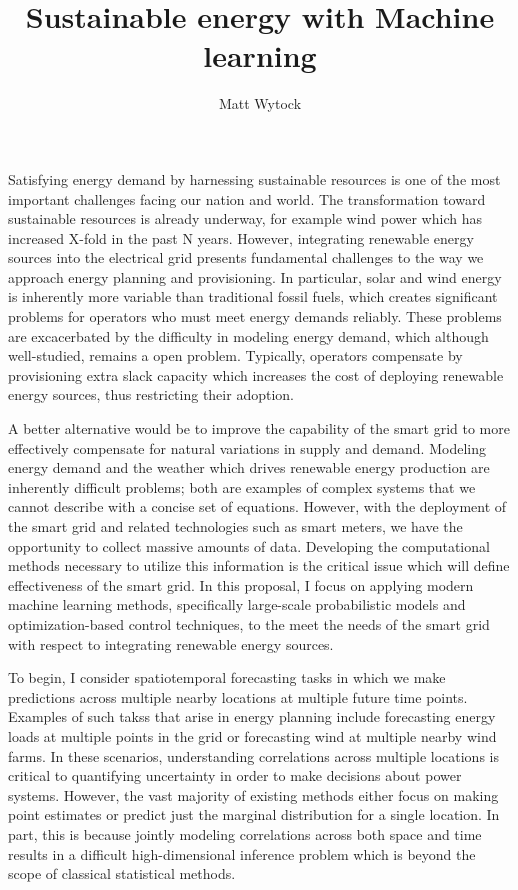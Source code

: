 \documentclass[12pt]{article}
\title{Sustainable energy with Machine learning}
\author{Matt Wytock}
\begin{document}
Satisfying energy demand by harnessing sustainable resources is one of the most important challenges facing our nation and world. The transformation toward sustainable resources is already underway, for example wind power which has increased X-fold in the past N years. However, integrating renewable energy sources into the electrical grid presents fundamental challenges to the way we approach energy planning and provisioning. In particular, solar and wind energy is inherently more variable than traditional fossil fuels, which creates significant problems for operators who must meet energy demands reliably. These  problems are excacerbated by the difficulty in modeling energy demand, which although well-studied, remains a open problem. Typically, operators compensate by provisioning extra slack capacity which increases the cost of deploying renewable energy sources, thus restricting their adoption.

A better alternative would be to improve the capability of the smart grid to more effectively compensate for natural variations in supply and demand. Modeling energy demand and the weather which drives renewable energy production are inherently difficult problems; both are examples of complex systems that we cannot describe with a concise set of equations. However, with the deployment of the smart grid and related technologies such as smart meters, we have the opportunity to collect massive amounts of data. Developing the computational methods necessary to utilize this information is the critical issue which will define effectiveness of the smart grid. In this proposal, I focus on applying modern machine learning methods, specifically large-scale probabilistic models and optimization-based control techniques, to the meet the needs of the smart grid with respect to integrating renewable energy sources.

To begin, I consider spatiotemporal forecasting tasks in which we make predictions across multiple nearby locations at multiple future time points. Examples of such takss that arise in energy planning include forecasting energy loads at multiple points in the grid or forecasting wind at multiple nearby wind farms. In these scenarios, understanding correlations across multiple locations is critical to quantifying uncertainty in order to make decisions about power systems. However, the vast majority of existing methods either focus on making point estimates or predict just the marginal distribution for a single location. In part, this is because jointly modeling correlations across both space and time results in a difficult high-dimensional inference problem which is beyond the scope of classical statistical methods.
\end{document}
